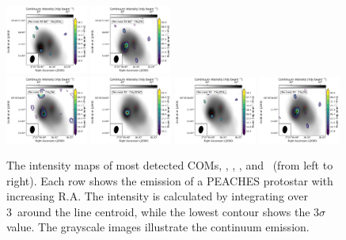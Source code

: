 \begin{figure}[htbp!]
  \includegraphics[width=0.24\textwidth]{./moment0/Set1_ID01_4_CH3OCH3_259311.pdf}
  \includegraphics[width=0.24\textwidth]{./moment0/Set1_ID01_4_CH3CN_257527.pdf}
  \\
  \includegraphics[width=0.24\textwidth]{./moment0/Set1_ID01_CH3OH_243915.pdf}
  \includegraphics[width=0.24\textwidth]{./moment0/Set1_ID01_CH3OCHO_259342.pdf}
  \includegraphics[width=0.24\textwidth]{./moment0/Set1_ID01_CH3OCH3_259311.pdf}
  \includegraphics[width=0.24\textwidth]{./moment0/Set1_ID01_CH3CN_257527.pdf}
  \\
  \caption{The intensity maps of most detected COMs, \methanol, \methylcyanide, \methylformate, and \dimethylether\ (from left to right).  
          Each row shows the emission of a PEACHES protostar with increasing R.A.
          The intensity is calculated by integrating over 3\kms\ around the line centroid, while the lowest contour shows the 3$\sigma$ value.  
          The grayscale images illustrate the continuum emission.}
  \label{fig:coms_map_all}
\end{figure}
